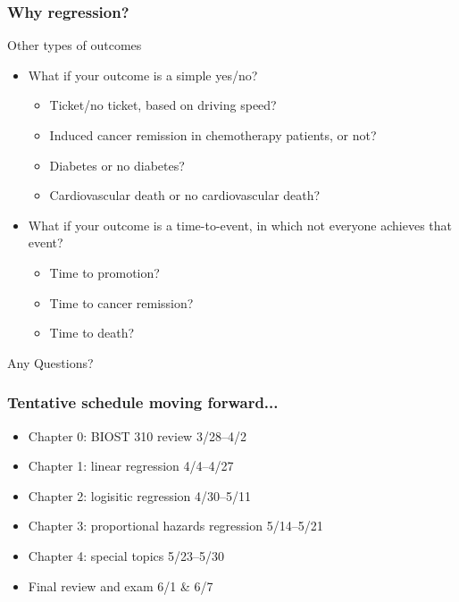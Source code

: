 \documentclass[12pt, 
hyperref={colorlinks=true, linkcolor=blue, urlcolor=cyan}]{beamer}
\begin{document}
\begin{frame}
\frametitle{Why regression?}
Other types of outcomes
\begin{itemize} %
\item What if your outcome is a simple yes/no?
	\begin{itemize}
	\item Ticket/no ticket, based on driving speed?
	\item Induced cancer remission in chemotherapy patients, or not?
	\item Diabetes or no diabetes?
	\item Cardiovascular death or no cardiovascular death?
	\end{itemize}
\item What if your outcome is a time-to-event, in which not everyone achieves that event?
	\begin{itemize}
	\item Time to promotion?
	\item Time to cancer remission?
	\item Time to death?
	\end{itemize}
\end{itemize}
\end{frame}

\begin{frame}
\center \Large Any Questions?
\end{frame}

\begin{frame}
\frametitle{Tentative schedule moving forward...}
\begin{itemize}
\item Chapter 0: BIOST 310 review \hfill 3/28--4/2
\item Chapter 1: linear regression \hfill 4/4--4/27
\item Chapter 2: logisitic regression \hfill 4/30--5/11
\item Chapter 3: proportional hazards regression \hfill 5/14--5/21
\item Chapter 4: special topics \hfill 5/23--5/30
\item Final review and exam \hfill 6/1 \& 6/7
\end{itemize}
\end{frame}


\end{document}

